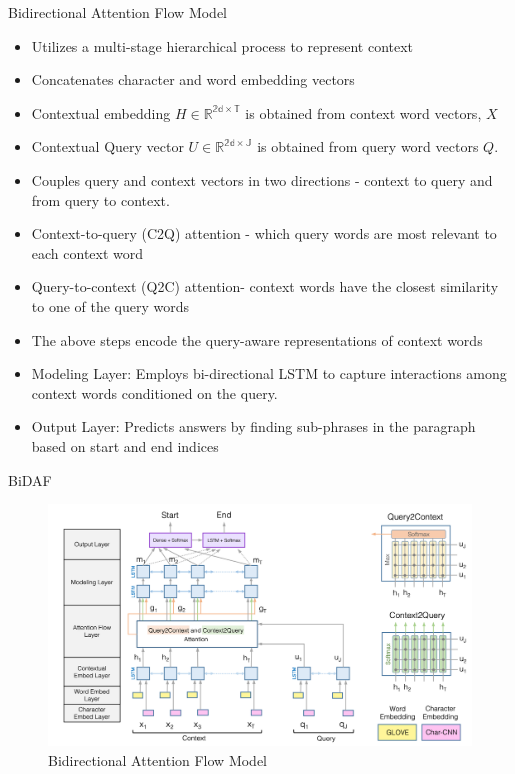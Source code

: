 \begin{frame}{Bidirectional Attention Flow Model}
    \begin{itemize}
        \item
        Utilizes  a multi-stage hierarchical process to represent context\cite{seo2018bidirectional}
        \item Concatenates  character and word embedding vectors
        \item Contextual embedding $H \in \mathbb{R^{2d\times T}}$ is obtained from context word vectors, $X$
        \item Contextual Query vector $U\in \mathbb{R^{2d\times J}}$ is obtained from query word vectors $Q$.
 \item Couples query and context vectors in two directions - context to query and from query to context.
 \item Context-to-query (C2Q) attention - which query words are most relevant to each context word
 \item Query-to-context (Q2C) attention- context words have the closest similarity to one of the query words
 \item The above steps  encode the query-aware representations of context words

        \item Modeling Layer: Employs bi-directional LSTM to capture interactions among context words conditioned on the query.
        \item Output Layer: Predicts answers by finding sub-phrases in the paragraph based on start and end indices

    \end{itemize}
\end{frame}
\begin{frame}{BiDAF}
    \begin{figure}
        \centering
        \includegraphics[width=0.9\linewidth]{Images/BidirectionalAttentionFlowModel}
        \caption{Bidirectional Attention Flow Model}
        \label{fig:bidirectionalattentionflowmodel}
    \end{figure}
\end{frame}
